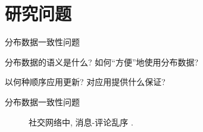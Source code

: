 \section{研究问题}

\begin{frame}{分布数据一致性问题}
  \graphicspath{{tikz-in-beamer/}}
  \begin{figure}[h!]
    \centering
    \begin{adjustbox}{max totalsize = {0.50\textwidth}{1.00\textheight}, center}
	  
    \end{adjustbox}
  \end{figure}

  \vspace{0.30cm}
  \begin{description}
	\item<3->[上层应用:] 分布数据的语义是什么? 如何``方便''地使用分布数据?
	\item<4->[数据副本:] 以何种顺序应用更新? 对应用提供什么保证?
  \end{description}
\end{frame}
\begin{frame}{分布数据一致性问题}
  \begin{figure}[h!]
    \centering
    \begin{adjustbox}{max totalsize = {0.70\textwidth}{1.00\textheight}, center}
	  
    \end{adjustbox}
	\caption{社交网络中, 消息-评论乱序 .}
  \end{figure}
\end{frame}
